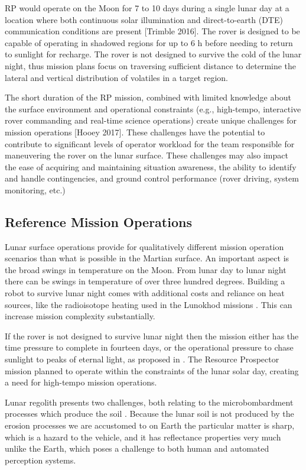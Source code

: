 \documentclass[twocolumn,letterpaper]{IEEEAerospaceCLS}  %
\begin{document}
RP would operate on the Moon for 7 to 10 days during a single lunar day at a location where both continuous solar illumination and direct-to-earth (DTE) communication conditions are present [Trimble 2016]. 
The rover is designed to be capable of operating in shadowed regions for up to 6 h before needing to return to sunlight for recharge. 
The rover is not designed to survive the cold of the lunar night, thus mission plans focus on traversing sufficient distance to determine the lateral and vertical distribution of volatiles in a target region.

The short duration of the RP mission, combined with limited knowledge about the surface environment and operational constraints (e.g., high-tempo, interactive rover commanding and real-time science operations) create unique challenges for mission operations [Hooey 2017]. 
These challenges have the potential to contribute to significant levels of operator workload for the team responsible for maneuvering the rover on the lunar surface. 
These challenges may also impact the ease of acquiring and maintaining situation awareness, the ability to identify and handle contingencies, and ground control performance (rover driving, system monitoring, etc.)

\subsection{Reference Mission Operations}
Lunar surface operations provide for qualitatively different mission operation scenarios than what is possible in the Martian surface.  
An important aspect is the broad swings in temperature on the Moon.  
From lunar day to lunar night there can be swings in temperature of over three hundred degrees.  
Building a robot to survive lunar night comes with additional costs and reliance on heat sources, like the radioisotope heating used in the Lunokhod missions \cite{ulamec2010survive}.  
This can increase mission complexity substantially.  

If the rover is not designed to survive lunar night then the mission either has the time pressure to complete in fourteen days, or the operational pressure to chase sunlight to peaks of eternal light, as proposed in \cite{otten2018strategic}.  
The Resource Prospector mission planned to operate within the constraints of the lunar solar day, creating a need for high-tempo mission operations. 

Lunar regolith presents two challenges, both relating to the microbombardment processes which produce the soil \cite{XXX}.  
Because the lunar soil is not produced by the erosion processes we are accustomed to on Earth the particular matter is sharp, which is a hazard to the vehicle, and it has reflectance properties very much unlike the Earth, which poses a challenge to both human and automated perception systems. 
\end{document}
